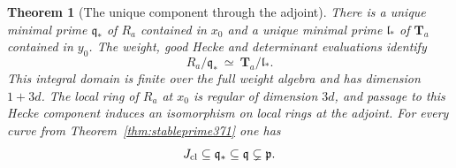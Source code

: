 \documentclass[a4paper,11pt]{article}
\newtheorem{theorem}[proposition]{Theorem}
\theoremstyle{definition}
\theoremstyle{remark}
\numberwithin{equation}{section}
\begin{document}
\begin{theorem}[The unique component through the adjoint]
\label{thm:adjcomponent372}
There is a unique minimal prime \(\mathfrak q_*\) of \(R_a\)
contained in \(x_0\) and a unique minimal prime
\(\mathfrak l_*\) of \(\mathbf T_a\) contained in \(y_0\).
The weight, good Hecke and determinant evaluations identify
\[
          R_a/\mathfrak q_*\ \simeq\
                    \mathbf T_a/\mathfrak l_* .
\]
This integral domain is finite over the full weight algebra
and has dimension \(1+3d\). The local ring of \(R_a\) at
\(x_0\) is regular of dimension \(3d\), and passage to
this Hecke component induces an isomorphism on local rings
at the adjoint. For every curve from
Theorem~\ref{thm:stableprime371} one has
\[
              J_{\rm cl}\subseteq \mathfrak q_*
                         \subseteq\mathfrak q\subsetneq\mathfrak p .
\]
\end{theorem}
\end{document}
